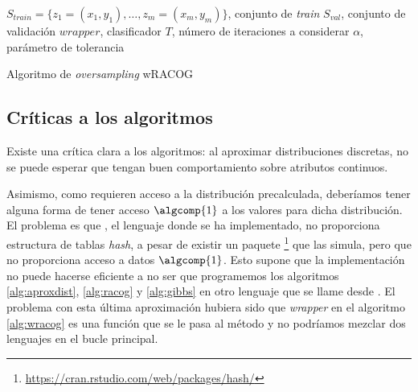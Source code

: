 \begin{algorithm}[H]
\begin{algorithmic}[1]
  \REQUIRE $S_{train} = \{z_1=(x_1, y_1), \ldots, z_m=(x_m, y_m)\}$, conjunto de \textit{train}
  \REQUIRE $S_{val}$, conjunto de validación
  \REQUIRE $wrapper$, clasificador
  \REQUIRE $T$, número de iteraciones a considerar
  \REQUIRE $\alpha$, parámetro de tolerancia
  \NEWLINE
  \ENDWHILE
  \NEWLINE
\end{algorithmic}
\caption{Algoritmo de \textit{oversampling} wRACOG}
\label{alg:wracog}
\end{algorithm}

\subsection{Críticas a los algoritmos}
Existe una crítica clara a los algoritmos: al aproximar distribuciones discretas, no se puede esperar que tengan buen 
comportamiento sobre atributos continuos.

Asimismo, como requieren acceso a la distribución precalculada, deberíamos tener alguna forma de tener acceso $\algcomp{1}$ a
los valores para dicha distribución. El problema es que \R, el lenguaje donde se ha implementado, no proporciona estructura
de tablas \textit{hash}, a pesar de existir un paquete \footnote{\url{https://cran.rstudio.com/web/packages/hash/}} que 
las simula, pero que no proporciona acceso a datos $\algcomp{1}$. Esto supone que la implementación no puede hacerse eficiente
a no ser que programemos los algoritmos \ref{alg:aproxdist}, \ref{alg:racog} y \ref{alg:gibbs} en otro lenguaje que se llame
desde \R. El problema con esta última aproximación hubiera sido que \textit{wrapper} en el algoritmo \ref{alg:wracog} es
una función que se le pasa al método y no podríamos mezclar dos lenguajes en el bucle principal.


%

